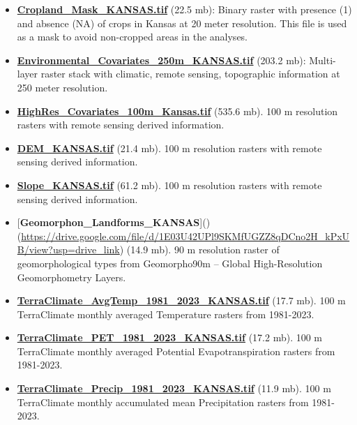 \documentclass[
  10pt,
  b5paper,
  oneside]{book}
\providecommand{\tightlist}{%
  \setlength{\itemsep}{0pt}\setlength{\parskip}{0pt}}
\begin{document}
\begin{itemize}
\tightlist
\item
  \href{https://drive.google.com/file/d/1wh6xSW03YKrCHScJJa0c_cSA1XZ8tYY-/view?usp=drive_link}{\textbf{Cropland\_Mask\_KANSAS.tif}} (22.5 mb): Binary raster with presence (1) and absence (NA) of crops in Kansas at 20 meter resolution. This file is used as a mask to avoid non-cropped areas in the analyses.
\item
  \href{https://drive.google.com/file/d/1wURPmPLi2LdYq6zBhZN1e91EiiZsk8oX/view?usp=drive_link}{\textbf{Environmental\_Covariates\_250m\_KANSAS.tif}} (203.2 mb): Multi-layer raster stack with climatic, remote sensing, topographic information at 250 meter resolution.
\item
  \href{https://drive.google.com/file/d/1xf89gn4pBKsb5ynVIfKZd4MbT3ZL1Nf2/view?usp=drive_link}{\textbf{HighRes\_Covariates\_100m\_Kansas.tif}} (535.6 mb). 100 m resolution rasters with remote sensing derived information.
\item
  \href{https://drive.google.com/file/d/14KmmjjTfVD7jTEuQqCLkfcQmXy0VBDkA/view?usp=drive_link}{\textbf{DEM\_KANSAS.tif}} (21.4 mb). 100 m resolution rasters with remote sensing derived information.
\item
  \href{https://drive.google.com/file/d/1rESziVFlEvEEmrKacb88R1pKZxbrU7qS/view?usp=drive_link}{\textbf{Slope\_KANSAS.tif}} (61.2 mb). 100 m resolution rasters with remote sensing derived information.
\item
  {[}\textbf{Geomorphon\_Landforms\_KANSAS}{]}()(\url{https://drive.google.com/file/d/1E03U42UPl9SKMfUGZZ8qDCno2H_kPxUB/view?usp=drive_link}) (14.9 mb). 90 m resolution raster of geomorphological types from Geomorpho90m -- Global High-Resolution Geomorphometry Layers.
\item
  \href{https://drive.google.com/file/d/1TyyErHkQeNW9Q_wchW9Fa_0UpdaWS_-_/view?usp=drive_link}{\textbf{TerraClimate\_AvgTemp\_1981\_2023\_KANSAS.tif}} (17.7 mb). 100 m TerraClimate monthly averaged Temperature rasters from 1981-2023.
\item
  \href{https://drive.google.com/file/d/1b9wM3zwggBFS98pFEyWUFtpKN9ORq9we/view?usp=drive_link}{\textbf{TerraClimate\_PET\_1981\_2023\_KANSAS.tif}} (17.2 mb). 100 m TerraClimate monthly averaged Potential Evapotranspiration rasters from 1981-2023.
\item
  \href{https://drive.google.com/file/d/1xq6y8jNUjDbipXHQE1w67f_vxQeXACkH/view?usp=drive_link}{\textbf{TerraClimate\_Precip\_1981\_2023\_KANSAS.tif}} (11.9 mb). 100 m TerraClimate monthly accumulated mean Precipitation rasters from 1981-2023.

\end{itemize}
\end{document}
